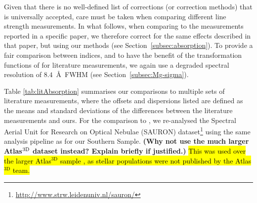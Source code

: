 \documentclass[a4paper,fleqn,usenatbib]{mnras}
\DeclareRobustCommand{\added}[1]{{\sethlcolor{green}\hl{#1}}}
\begin{document}
Given that there is no well-defined list of corrections (or correction
methods) that is universally accepted, care must be taken when
comparing different line strength measurements. In what follows, when
comparing to the measurements reported in a specific paper, we
therefore correct for the same effects described in that paper, but
using our methods (see Section~\ref{subsec:absorption}). To provide a
fair comparison between indices, and to have the benefit of the
transformation functions of \citet{Vazdekis2010} for literature
measurements, we again use a degraded spectral resolution of
$8.4$~\AA\ FWHM (see Section~\ref{subsec:Mg-sigma}).

Table \ref{tab:litAbsorption} summarises our comparisons to multiple
sets of literature measurements, where the offsets and dispersions
listed are defined as the means and standard deviations of the
differences between the literature measurements and ours. For the
comparison to \citet{Vazdekis2010}, we re-analysed the Spectral Aerial
Unit for Research on Optical Nebulae (SAURON)
dataset\footnote{\url{http://www.strw.leidenuniv.nl/sauron/}}
\citep{Emsellem2004} using the same analysis pipeline as for our
Southern Sample. {\bf (Why not use the much larger Atlas$^{\rm 3D}$
  dataset instead? Explain briefly if justified.)} \added{This was used over the larger Atlas$^\text{3D}$ sample \citep{Cappellari2011}, as stellar populations were not published by the Atlas$^\text{3D}$ team.}
\end{document}
